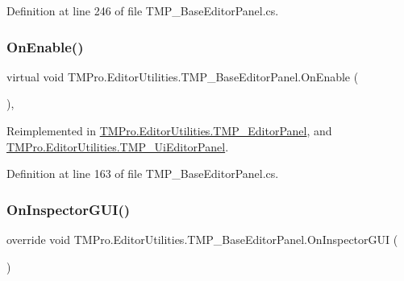Definition at line 246 of file T\+M\+P\+\_\+\+Base\+Editor\+Panel.\+cs.

\mbox{\label{class_t_m_pro_1_1_editor_utilities_1_1_t_m_p___base_editor_panel_a3a60309b317f09709852e0c8013e6849}} 
\subsubsection{\texorpdfstring{OnEnable()}{OnEnable()}}
{\footnotesize\ttfamily virtual void T\+M\+Pro.\+Editor\+Utilities.\+T\+M\+P\+\_\+\+Base\+Editor\+Panel.\+On\+Enable (\begin{DoxyParamCaption}{ }\end{DoxyParamCaption})\hspace{0.3cm}{\ttfamily [protected]}, {\ttfamily [virtual]}}



Reimplemented in \mbox{\hyperlink{class_t_m_pro_1_1_editor_utilities_1_1_t_m_p___editor_panel_a5c6c52a7543455d4968fb1c438f73c18}{T\+M\+Pro.\+Editor\+Utilities.\+T\+M\+P\+\_\+\+Editor\+Panel}}, and \mbox{\hyperlink{class_t_m_pro_1_1_editor_utilities_1_1_t_m_p___ui_editor_panel_a24f0d3266f3db540b638e349e29793d9}{T\+M\+Pro.\+Editor\+Utilities.\+T\+M\+P\+\_\+\+Ui\+Editor\+Panel}}.



Definition at line 163 of file T\+M\+P\+\_\+\+Base\+Editor\+Panel.\+cs.

\mbox{\label{class_t_m_pro_1_1_editor_utilities_1_1_t_m_p___base_editor_panel_a7ff0cf356660eaff8f0280fb6b0aaffd}} 
\subsubsection{\texorpdfstring{OnInspectorGUI()}{OnInspectorGUI()}}
{\footnotesize\ttfamily override void T\+M\+Pro.\+Editor\+Utilities.\+T\+M\+P\+\_\+\+Base\+Editor\+Panel.\+On\+Inspector\+G\+UI (\begin{DoxyParamCaption}{ }\end{DoxyParamCaption})}



